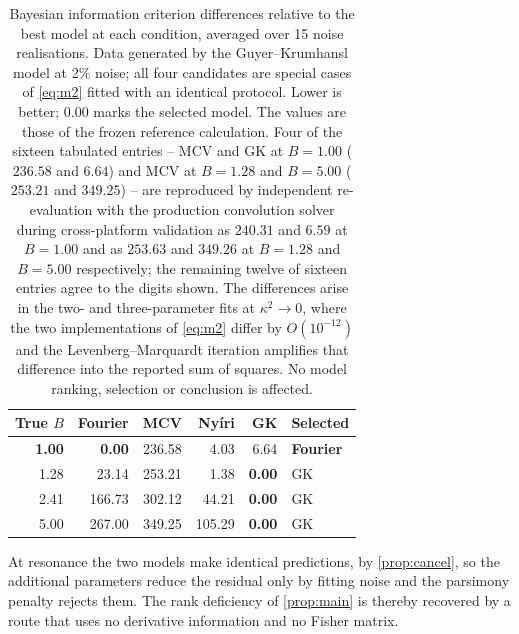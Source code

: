 \documentclass[preprint,12pt,a4paper]{elsarticle}
\theoremstyle{plain}
\theoremstyle{definition}
\theoremstyle{remark}
\newcommand{\kk}{\kappa^{2}}
\newcommand{\Bnum}{B}
\begin{document}
\begin{table}[htbp]
  \centering
  \caption{Bayesian information criterion differences relative to the best
           model at each condition, averaged over 15 noise realisations. Data
           generated by the Guyer--Krumhansl model at 2\% noise; all four
           candidates are special cases of \eqref{eq:m2} fitted with an
           identical protocol. Lower is better; $0.00$ marks the selected
           model. The values are those of the frozen reference calculation.
           Four of the sixteen tabulated entries -- MCV and GK at
           $\Bnum=1.00$ ($236.58$ and $6.64$) and MCV at $\Bnum=1.28$ and
           $\Bnum=5.00$ ($253.21$ and $349.25$) -- are reproduced by
           independent re-evaluation with the production convolution solver
           during cross-platform validation as $240.31$ and $6.59$ at
           $\Bnum=1.00$ and as $253.63$ and $349.26$ at $\Bnum=1.28$ and
           $\Bnum=5.00$ respectively; the remaining twelve of sixteen entries
           agree to the digits shown. The differences arise in the two- and
           three-parameter fits at $\kk\to0$, where the two implementations of
           \eqref{eq:m2} differ by $O(10^{-12})$ and the
           Levenberg--Marquardt iteration amplifies that difference into the
           reported sum of squares. No model ranking, selection or conclusion
           is affected.}
  \label{tab:bic}
  \small
  \begin{tabular}{@{}rrrrrl@{}}
    \toprule
    \textbf{True} $\Bnum$ & \textbf{Fourier} & \textbf{MCV} &
    \textbf{Nyíri} & \textbf{GK} & \textbf{Selected} \\
    \midrule
    \textbf{1.00} & \textbf{0.00} & 236.58 & 4.03 & 6.64 & \textbf{Fourier} \\
    1.28 & 23.14  & 253.21 & 1.38   & \textbf{0.00} & GK \\
    2.41 & 166.73 & 302.12 & 44.21  & \textbf{0.00} & GK \\
    5.00 & 267.00 & 349.25 & 105.29 & \textbf{0.00} & GK \\
    \bottomrule
  \end{tabular}
\end{table}
 At resonance the two models make identical predictions, by
\cref{prop:cancel}, so the additional parameters reduce the residual only by
fitting noise and the parsimony penalty rejects them. The rank deficiency of
\cref{prop:main} is thereby recovered by a route that uses no derivative
information and no Fisher matrix.
\end{document}
